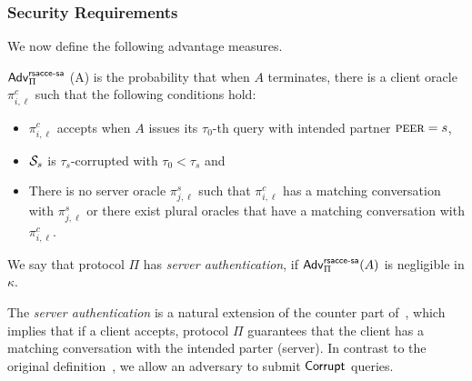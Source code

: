 \subsubsection{Security Requirements}
We now define the following advantage measures.

\begin{definition} \label{def:rsacce-sa}
 $\mathsf{Adv}^{\mathsf{rsacce\textsc{-} sa}}_{\Pi}$ (A) is the probability that when $A$ terminates, there is
 a client oracle $\pi^c_{i, \ell}$ such that the following conditions hold:
 \begin{itemize}
  \item{$\pi^c_{i, \ell}$ accepts when $A$ issues its $\tau_0$-th query with intended partner $\textsc{peer}=s$, }
  \item{$\mathcal{S}_s$ is $\tau_{s}$-corrupted with $\tau_0 < \tau_{s}$ and}
  \item{There is no server oracle $\pi^s_{j, \ell}$ such that $\pi^c_{i,\ell}$ has a matching conversation
  with $\pi^s_{j,\ell}$ or there exist plural oracles that have a matching conversation with $\pi^c_{i,\ell}$.}
 \end{itemize}
 We say that protocol $\Pi$ has \textit{server authentication}, if
 $\mathsf{Adv}^{\mathsf{rsacce\textsc{-} sa}}_{\Pi}(A)$ is negligible in $\kappa$.
\end{definition}

\begin{remark}
 The \textit{server authentication}  is a natural extension of the counter part of~\cite{KPW13:SACCE},
 which implies that if a client accepts, protocol $\Pi$ guarantees that the client has a matching conversation with
 the intended parter (server). In contrast to the original definition~\cite{KPW13:SACCE},
 we allow an adversary to submit $\mathsf{Corrupt}$ queries.
 \end{remark}

